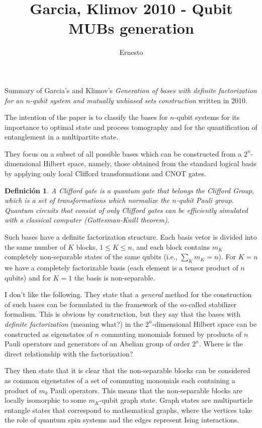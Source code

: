 \documentclass[a4paper,11pt]{report}
\title{Garcia, Klimov 2010 - Qubit MUBs generation}
\author{Ernesto}
\newtheorem{definition}{Definición}
\begin{document}
    \maketitle

    Summary of Garcia's and Klimov's \textit{Generation of
    bases with definite factorization for an $n$-qubit
    system and mutually unbiased sets construction} written
    in 2010.

    The intention of the paper is to classify the bases for
    $n$-qubit systems for its importance to optimal state
    and process tomography and for the quantification of
    entanglement in a multipartite state.

    They focus on a subset of all possible bases which can
    be constructed from a $2^{n}$-dimensional Hilbert space,
    namely, those obtained from the standard logical basis
    by applying only local Clifford transformations and CNOT
    gates.

    \begin{definition}
        A Clifford gate is a quantum gate that belongs the
        Clifford Group, which is a set of transformations
        which normalize the $n$-qubit Pauli group. Quantum
        circuits that consist of only Clifford gates can be
        efficiently simulated with a classical computer
        (Gottesman-Knill theorem).
    \end{definition}

    Such bases have a definite factorization structure. Each
    basis vetor is divided into the same number of $K$ 
    blocks, $1 \leq K \leq n$, and each block contains $m_K$ 
    completely non-separable states of the same qubits
    (i.e., $\sum_{K}^{} m_K = n$). For $K = n$ we have a
    completely factorizable basis (each element is a tensor
    product of $n$ qubits) and for $K = 1$ the basis is
    non-separable.

    I don't like the following. They state that a
    \textit{general} method for the construction of such
    bases can be formulated in the framework of the
    so-called stabilizer formalism. This is obvious by
    construction, but they say that the bases with
    \textit{definite factorization} (meaning what?) in the
    $2^{n}$-dimensional Hilbert space can be constructed as
    eigenstates of $n$ commuting monomials formed by
    products of $n$ Pauli operators and generators of an
    Abelian group of order $2^{n}$. Where is the direct
    relationship with the factorization?

    They then state that it is clear that the non-separable
    blocks can be considered as common eigenstates of a set
    of commuting monomials each containing a product of
    $m_k$ Pauli operators. This means that the non-separable
    blocks are locally isomorphic to some $m_K$-qubit graph
    state. Graph states are multiparticle entangle states
    that correspond to mathematical graphs, where the
    vertices take the role of quantum spin systems and the
    edges represent Ising interactions.
\end{document}
